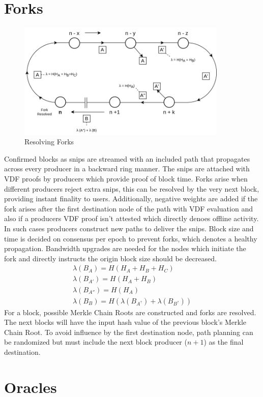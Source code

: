 \documentclass[a4paper,10pt]{article}
\begin{document}
\section{Forks}
\begin{figure}[H]
\begin{center}
\includegraphics[width=10cm]{fork}
\caption{Resolving Forks}
\end{center}
\end{figure}
Confirmed blocks as snips are streamed with an included path that propagates across every producer in a backward ring manner. The snips are attached with VDF proofs by producers which provide proof of block time. Forks arise when different producers reject extra snips, this can be resolved by the very next block, providing instant finality to users. Additionally, negative weights are added if the fork arises after the first destination node of the path with VDF evaluation and also if a producers VDF proof isn't attested which directly denoes offline activity. In such cases producers construct new paths to deliver the snips. Block size and time is decided on consensus per epoch to prevent forks, which denotes a healthy propagation. Bandwidth upgrades are needed for the nodes which initiate the fork and directly instructs the origin block size should be decreased. 
\begin{align*}
\lambda (B_A) = H(H_A+H_B+H_C) \\
\lambda (B_{A'}) = H(H_A+H_B)\\
\lambda (B_{A''}) = H(H_A)  \\
\lambda (B_{B}) = H(\lambda(B_{A^?}) + \lambda(B_{B^?}))
\end{align*}
For a block, possible Merkle Chain Roots are constructed and forks are resolved. The next blocks will have the input hash value of the previous block's Merkle Chain Root. To avoid influence by the first destination node, path planning can be randomized but must include the next block producer ($n+1$) as the final destination.
\section{Oracles}
\end{document}
